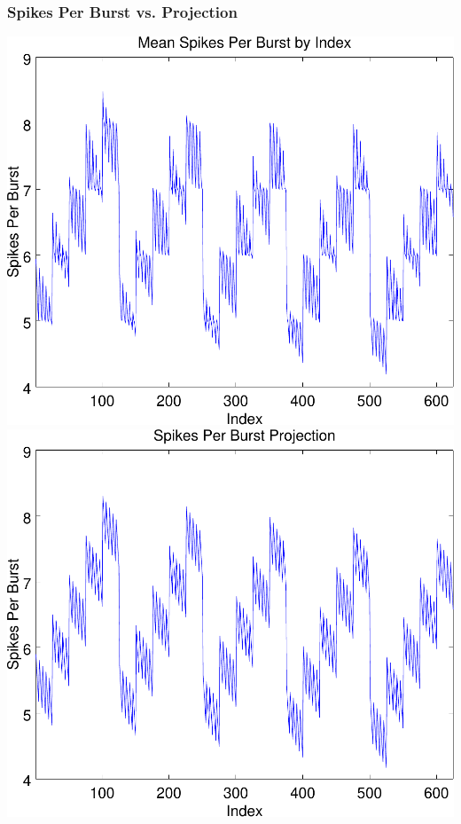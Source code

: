 \documentclass{beamer}
\theoremstyle{plain}
\theoremstyle{definition}
\begin{document}
\begin{frame}\frametitle{Spikes Per Burst vs. Projection}
  \begin{center}
    \includegraphics[scale=.32]{SpikesPerBurst.pdf}%
    \includegraphics[scale=.32]{SpikesPerBurstProjection.pdf}
  \end{center}
\end{frame}

\end{document}
